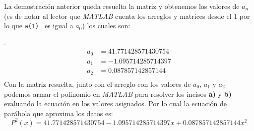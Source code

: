 \documentclass[11pt,letterpaper]{article}
\begin{document}
La demostración anterior queda resuelta la matriz y obtenemos los valores de $a_n$ (es de notar al lector que \textit{MATLAB} cuenta los arreglos y matrices desde el 1 por lo que \texttt{a(1)	} es igual a $a_0$) los cuales son: \par. 
\begin{align*}
a_0 &= 41.771428571430754 \\
a_1 &= -1.095714285714397 \\
a_2 &= 0.087857142857144 \\
\end{align*}
Con la matriz resuelta, junto con el arreglo con los valores de $a_0$, $a_1$ y $a_2$ podemos armar el polinomio en \textit{MATLAB} para resolver los incisos \textbf{a)} y \textbf{b)} evaluando la ecuación en los valores asignados. Por lo cual la ecuación de parábola que aproxima los datos es: 
$$P^2(x) =  41.771428571430754  - 1.095714285714397x + 0.087857142857144x^2$$ 
\end{document}
